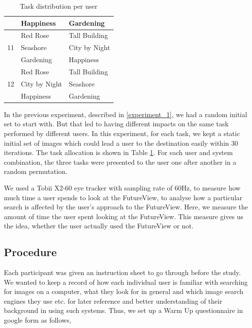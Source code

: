 \documentclass[english]{tktltiki}
\begin{document}
\begin{table}[h]
\begin{tabular}{ |l|l|l| }
 			& Happiness & Gardening \\
 		\hline
 		\multirow{3}{*}{11} & Red Rose & Tall Building \\
 			& Seashore & City by Night \\
 			& Gardening & Happiness \\
 		\hline
 		\multirow{3}{*}{12} & Red Rose & Tall Building \\
 			& City by Night & Seashore \\
 			& Happiness & Gardening \\
 		\hline
	\end{tabular}
	\caption{Task distribution per user}
    \label{table:table_task_allocation}
\end{table}


In the previous experiment, described in \ref{experiment_1}, we had a random initial set to start with. But that led to having different impacts on the same task performed by different users. In this experiment, for each task, we kept a static initial set of images which could lead a user to the destination easily within $30$ iterations. The task allocation is shown in Table \ref{table:table_task_allocation}. For each user and system combination, the three tasks were presented to the user one after another in a random permutation.

We used a Tobii X2-60 eye tracker with sampling rate of 60Hz, to measure how much time a user spends to look at the FutureView, to analyse how a particular search is affected by the user's approach to the FutureView. Here, we measure the amount of time the user spent looking at the FutureView. This measure gives us the idea, whether the user actually used the FutureView or not.


\subsection{Procedure}


Each participant was given an instruction sheet to go through before the study. We wanted to keep a record of how each individual user is familiar with searching for images on a computer, what they look for in general and which image search engines they use etc. for later reference and better understanding of their background in using such systems. Thus, we set up a Warm Up questionnaire in google form as follows,
\end{document}

